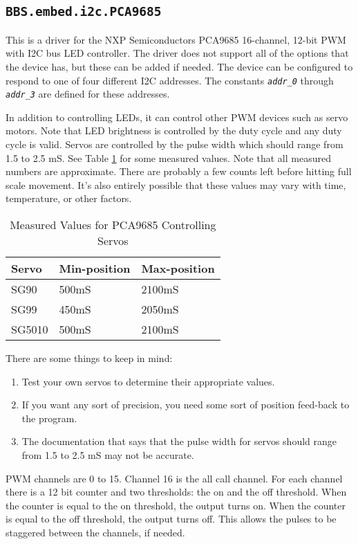 \documentclass[10pt, openany]{book}
\newcommand{\package}[1]{\texttt{#1}}
\newcommand{\constant}[1]{\emph{\texttt{#1}}}
\begin{document}
\subsection{\package{BBS.embed.i2c.PCA9685}}
This is a driver for the NXP Semiconductors PCA9685 16-channel, 12-bit PWM with I2C bus LED controller\cite{PCA9685}.  The driver does not support all of the options that the device has, but these can be added if needed.  The device can be configured to respond to one of four different I2C addresses.  The constants \constant{addr\_0} through \constant{addr\_3} are defined for these addresses.

In addition to controlling LEDs, it can control other PWM devices such as servo motors.  Note that LED brightness is controlled by the duty cycle and any duty cycle is valid.  Servos are controlled by the pulse width which should range from 1.5 to 2.5 mS.  See Table \ref{tbl:PCA9685Servo} for some measured values.  Note that all measured numbers are approximate.  There are probably a few  counts left before hitting full scale movement.  It's also entirely possible  that these values may vary with time, temperature, or other factors.

\begin{table}[!h]
\begin{center}
  \begin{tabular}{l|l|l}
    Servo & Min-position & Max-position \\
    \hline
    SG90 & 500mS & 2100mS \\
    SG99 & 450mS & 2050mS \\
    SG5010 & 500mS & 2100mS \\
  \end{tabular}
  \caption{Measured Values for PCA9685 Controlling Servos}
  \label{tbl:PCA9685Servo}
\end{center}
\end{table}

There are some things to keep in mind:
\begin{enumerate}
  \item Test your own servos to determine their appropriate values.
  \item If you want any sort of precision, you need some sort of position feed-back to the program.
  \item The documentation that says that the pulse width for servos should range from 1.5 to 2.5 mS may not be accurate.
\end{enumerate}

PWM channels are 0 to 15.  Channel 16 is the all call channel.  For each channel there is a 12 bit counter and two thresholds: the on and the off threshold.  When the counter is equal to the on threshold, the output turns on.  When the counter is equal to the off threshold, the output turns off.  This allows the pulses to be staggered between the channels, if needed.
\end{document}
